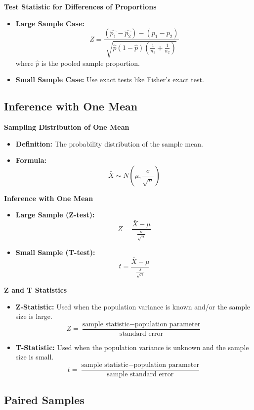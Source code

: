 \documentclass{article}
\begin{document}
\textbf{Test Statistic for Differences of Proportions}
\begin{itemize}
    \item \textbf{Large Sample Case:}
    \[
    Z = \frac{(\hat{p_1} - \hat{p_2}) - (p_1 - p_2)}{\sqrt{\hat{p}(1-\hat{p})\left(\frac{1}{n_1} + \frac{1}{n_2}\right)}}
    \]
    where \(\hat{p}\) is the pooled sample proportion.
    \item \textbf{Small Sample Case:} Use exact tests like Fisher’s exact test.
\end{itemize}

\subsection*{Inference with One Mean}

\textbf{Sampling Distribution of One Mean}
\begin{itemize}
    \item \textbf{Definition:} The probability distribution of the sample mean.
    \item \textbf{Formula:}
    \[
    \bar{X} \sim N\left(\mu, \frac{\sigma}{\sqrt{n}}\right)
    \]
\end{itemize}

\textbf{Inference with One Mean}
\begin{itemize}
    \item \textbf{Large Sample (Z-test):}
    \[
    Z = \frac{\bar{X} - \mu}{\frac{\sigma}{\sqrt{n}}}
    \]
    \item \textbf{Small Sample (T-test):}
    \[
    t = \frac{\bar{X} - \mu}{\frac{s}{\sqrt{n}}}
    \]
\end{itemize}

\textbf{Z and T Statistics}
\begin{itemize}
    \item \textbf{Z-Statistic:} Used when the population variance is known and/or the sample size is large.
    \[
    Z = \frac{\text{sample statistic} - \text{population parameter}}{\text{standard error}}
    \]
    \item \textbf{T-Statistic:} Used when the population variance is unknown and the sample size is small.
    \[
    t = \frac{\text{sample statistic} - \text{population parameter}}{\text{sample standard error}}
    \]
\end{itemize}

\subsection*{Paired Samples}
\end{document}
